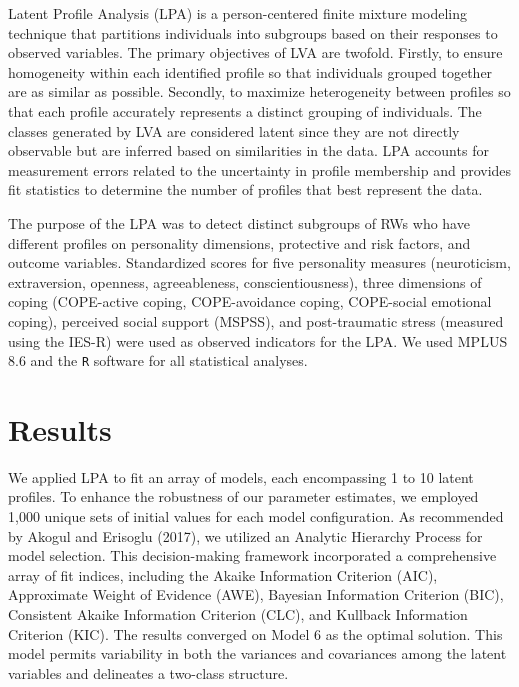 \documentclass[
  man,floatsintext]{apa7}
\begin{document}
Latent Profile Analysis (LPA) is a person-centered finite mixture modeling technique that partitions individuals into subgroups based on their responses to observed variables. The primary objectives of LVA are twofold. Firstly, to ensure homogeneity within each identified profile so that individuals grouped together are as similar as possible. Secondly, to maximize heterogeneity between profiles so that each profile accurately represents a distinct grouping of individuals. The classes generated by LVA are considered latent since they are not directly observable but are inferred based on similarities in the data. LPA accounts for measurement errors related to the uncertainty in profile membership and provides fit statistics to determine the number of profiles that best represent the data.

The purpose of the LPA was to detect distinct subgroups of RWs who have different profiles on personality dimensions, protective and risk factors, and outcome variables. Standardized scores for five personality measures (neuroticism, extraversion, openness, agreeableness, conscientiousness), three dimensions of coping (COPE-active coping, COPE-avoidance coping, COPE-social emotional coping), perceived social support (MSPSS), and post-traumatic stress (measured using the IES-R) were used as observed indicators for the LPA. We used MPLUS 8.6 and the \texttt{R} software for all statistical analyses.

\hypertarget{results}{%
\section{Results}\label{results}}

We applied LPA to fit an array of models, each encompassing 1 to 10 latent profiles. To enhance the robustness of our parameter estimates, we employed 1,000 unique sets of initial values for each model configuration. As recommended by Akogul and Erisoglu (2017), we utilized an Analytic Hierarchy Process for model selection. This decision-making framework incorporated a comprehensive array of fit indices, including the Akaike Information Criterion (AIC), Approximate Weight of Evidence (AWE), Bayesian Information Criterion (BIC), Consistent Akaike Information Criterion (CLC), and Kullback Information Criterion (KIC). The results converged on Model 6 as the optimal solution. This model permits variability in both the variances and covariances among the latent variables and delineates a two-class structure.
\end{document}
